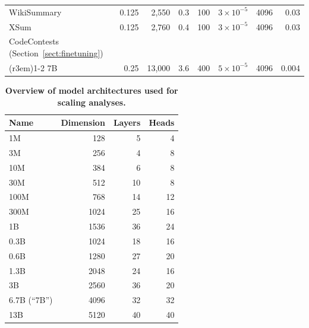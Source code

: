 \documentclass{article}
\theoremstyle{plain}
\theoremstyle{definition}
\theoremstyle{remark}
\begin{document}
\begin{table}[H]
{\begin{tabular}{lrrrrrrr}
        WikiSummary & 0.125 & 2,550 & 0.3 & 100 & $3 \times 10^{-5}$ & 4096 & 0.03 \\
        XSum & 0.125 & 2,760 & 0.4 & 100 & $3 \times 10^{-5}$ & 4096 & 0.03 \\
        \midrule
        \multicolumn{2}{l}{CodeContests (Section~\ref{sect:finetuning})} \\
        \cmidrule(r{3em}){1-2}
        7B & 0.25 & 13,000 & 3.6 & 400 & $5 \times 10^{-5}$ & 4096 & 0.004 \\
        \bottomrule
    \end{tabular}}
\end{table}

\begin{table}[!ht]
    \centering
        \caption{\textbf{Overview of model architectures used for scaling analyses.}}
    \label{tab:models}
    \begin{tabular}{lrrr}
        \toprule
        Name & Dimension & Layers & Heads \\
        \midrule
        1M & 128 & 5 & 4 \\
        3M & 256 & 4 & 8 \\
        10M & 384 & 6 & 8 \\
        30M & 512 & 10 & 8 \\
        100M & 768 & 14 & 12 \\
        300M & 1024 & 25 & 16 \\
        1B & 1536 & 36 & 24 \\
        \midrule
        0.3B & 1024 & 18 & 16 \\
        0.6B & 1280 & 27 & 20 \\
        1.3B & 2048 & 24 & 16 \\
        3B & 2560 & 36 & 20 \\
        6.7B (``7B'') & 4096 & 32 & 32 \\
        13B & 5120 & 40 & 40 \\
        \bottomrule
    \end{tabular}
\end{table}
\end{document}
